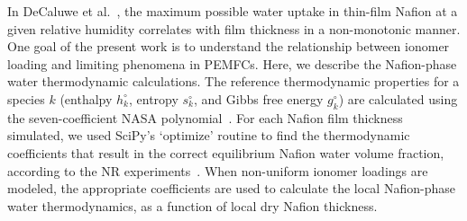 \documentclass[final,3p,times,twocolumn]{elsarticle}    %
\begin{document}
In DeCaluwe et al.~\cite{bib:decaluwe_2018}, the maximum possible water uptake in thin-film Nafion at a given relative humidity correlates with film thickness in a non-monotonic manner. One goal of the present work is to understand the relationship between ionomer loading and limiting phenomena in PEMFCs. Here, we describe the Nafion-phase water thermodynamic calculations. The reference thermodynamic properties for a species $k$ (enthalpy $h_k^\circ$, entropy $s_k^\circ$, and Gibbs free energy $g_k^\circ$) are calculated using the seven-coefficient NASA polynomial~\cite{bib:mcbride_1993}. For each Nafion film thickness simulated, we used SciPy's `optimize' routine to find the thermodynamic coefficients that result in the correct equilibrium Nafion water volume fraction, according to the NR experiments~\cite{bib:decaluwe_2018}.
When non-uniform ionomer loadings are modeled, the appropriate coefficients are used to calculate the local Nafion-phase water thermodynamics, as a function of local dry Nafion thickness. 
\end{document}
